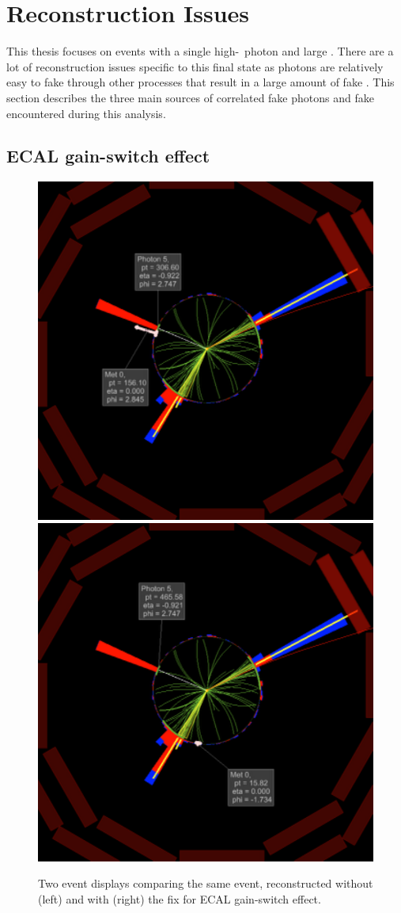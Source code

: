 \section{Reconstruction Issues}
\label{sec:issues}

This thesis focuses on events with a single high-\pt\ photon and large \met.
There are a lot of reconstruction issues specific to this final state as photons are relatively easy to fake through other processes that result in a large amount of fake \met.
This section describes the three main sources of correlated fake photons and fake \met encountered during this analysis.

\subsection{ECAL gain-switch effect}
\label{sec:gainswitch}

\begin{figure}[htbp]
  \centering
  \includegraphics[width=0.48\linewidth]{Reconstruction/Figures/gsfix/evdisp_before.pdf}
  \includegraphics[width=0.48\linewidth]{Reconstruction/Figures/gsfix/evdisp_after.pdf}
  \caption{
    Two event displays comparing the same event, reconstructed without (left) and with (right) the fix for ECAL gain-switch effect.
  }
  \label{fig:eventdisplay_gsfix}
\end{figure}

